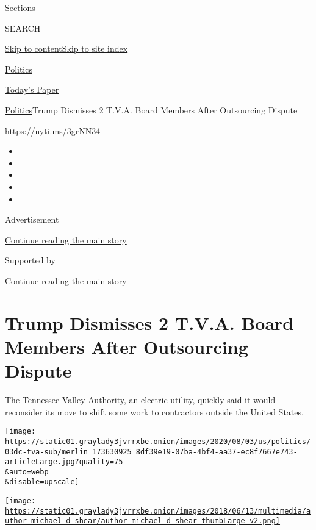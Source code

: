 Sections

SEARCH

\protect\hyperlink{site-content}{Skip to
content}\protect\hyperlink{site-index}{Skip to site index}

\href{https://www.nytimes3xbfgragh.onion/section/politics}{Politics}

\href{https://myaccount.nytimes3xbfgragh.onion/auth/login?response_type=cookie\&client_id=vi}{}

\href{https://www.nytimes3xbfgragh.onion/section/todayspaper}{Today's
Paper}

\href{/section/politics}{Politics}\textbar{}Trump Dismisses 2 T.V.A.
Board Members After Outsourcing Dispute

\href{https://nyti.ms/3grNN34}{https://nyti.ms/3grNN34}

\begin{itemize}
\item
\item
\item
\item
\item
\end{itemize}

Advertisement

\protect\hyperlink{after-top}{Continue reading the main story}

Supported by

\protect\hyperlink{after-sponsor}{Continue reading the main story}

\hypertarget{trump-dismisses-2-tva-board-members-after-outsourcing-dispute}{%
\section{Trump Dismisses 2 T.V.A. Board Members After Outsourcing
Dispute}\label{trump-dismisses-2-tva-board-members-after-outsourcing-dispute}}

The Tennessee Valley Authority, an electric utility, quickly said it
would reconsider its move to shift some work to contractors outside the
United States.

\texttt{[image: https://static01.graylady3jvrrxbe.onion/images/2020/08/03/us/politics/03dc-tva-sub/merlin\_173630925\_8df39e19-07ba-4bf4-aa37-ec8f7667e743-articleLarge.jpg?quality=75\\\&auto=webp\\\&disable=upscale]}

\href{https://www.nytimes3xbfgragh.onion/by/michael-d-shear}{\texttt{[image: https://static01.graylady3jvrrxbe.onion/images/2018/06/13/multimedia/author-michael-d-shear/author-michael-d-shear-thumbLarge-v2.png]}}


